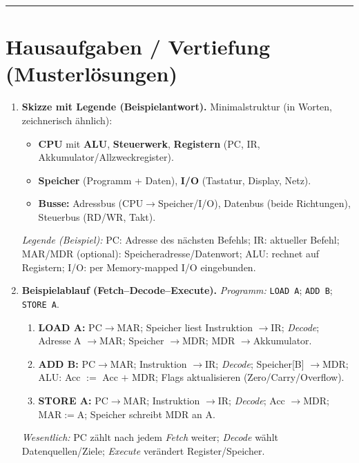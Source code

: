 \documentclass[11pt,a4paper]{scrartcl}
\begin{document}
	\hrule
	\vspace{0.6em}
	
	\section*{Hausaufgaben / Vertiefung (Musterlösungen)}
	
	\begin{enumerate}[leftmargin=*,label=\textbf{Aufgabe~\arabic*:}, itemsep=0.9em, start=1]
		
		\item \textbf{Skizze mit Legende (Beispielantwort).}\quad
		Minimalstruktur (in Worten, zeichnerisch ähnlich):
		\begin{itemize}
			\item \textbf{CPU} mit \textbf{ALU}, \textbf{Steuerwerk}, \textbf{Registern} (PC, IR, Akkumulator/Allzweckregister).
			\item \textbf{Speicher} (Programm + Daten), \textbf{I/O} (Tastatur, Display, Netz).
			\item \textbf{Busse:} Adressbus (CPU\(\rightarrow\)Speicher/I/O), Datenbus (beide Richtungen), Steuerbus (RD/WR, Takt).
		\end{itemize}
		\emph{Legende (Beispiel):} PC: Adresse des nächsten Befehls; IR: aktueller Befehl; MAR/MDR (optional): Speicheradresse/Datenwort; ALU: rechnet auf Registern; I/O: per Memory-mapped I/O eingebunden.
		
		\item \textbf{Beispielablauf (Fetch–Decode–Execute).}\quad
		\emph{Programm:} \texttt{LOAD A}; \texttt{ADD B}; \texttt{STORE A}.
		\begin{enumerate}[label*=\alph*)]
			\item \textbf{LOAD A:} PC\(\rightarrow\)MAR; Speicher liest Instruktion \(\rightarrow\)IR; \emph{Decode}; Adresse A \(\rightarrow\)MAR; Speicher \(\rightarrow\)MDR; MDR \(\rightarrow\)Akkumulator.
			\item \textbf{ADD B:} PC\(\rightarrow\)MAR; Instruktion \(\rightarrow\)IR; \emph{Decode}; Speicher[B] \(\rightarrow\)MDR; ALU: Acc \(:=\) Acc \(+\) MDR; Flags aktualisieren (Zero/Carry/Overflow).
			\item \textbf{STORE A:} PC\(\rightarrow\)MAR; Instruktion \(\rightarrow\)IR; \emph{Decode}; Acc \(\rightarrow\)MDR; MAR\(:=\)A; Speicher schreibt MDR an A.
		\end{enumerate}
		\emph{Wesentlich:} PC zählt nach jedem \emph{Fetch} weiter; \emph{Decode} wählt Datenquellen/Ziele; \emph{Execute} verändert Register/Speicher.
		

\end{enumerate}
\end{document}
